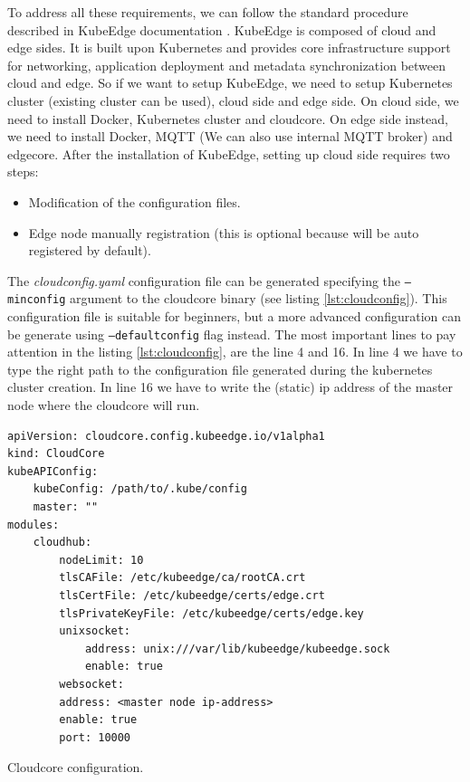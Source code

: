 To address all these requirements, we can follow the standard procedure described in KubeEdge documentation \cite{kubeedgedoc}.
KubeEdge is composed of cloud and edge sides. It is built upon Kubernetes and provides core infrastructure support for networking, application deployment and metadata synchronization between cloud and edge. So if we want to setup KubeEdge, we need to setup Kubernetes cluster (existing cluster can be used), cloud side and edge side.
On cloud side, we need to install Docker, Kubernetes cluster and cloudcore. On edge side instead, we need to install Docker, MQTT (We can also use internal MQTT broker) and edgecore. 
After the installation of KubeEdge, setting up cloud side requires two steps: 
\begin{itemize}
	\item Modification of the configuration files.
	\item Edge node manually registration (this is optional because will be auto registered by default).
\end{itemize}

The \textit{cloudconfig.yaml} configuration file can be generated specifying the \texttt{--minconfig} argument to the cloudcore binary (see listing \ref{lst:cloudconfig}).
This configuration file is suitable for beginners, but a more advanced configuration can be generate using \texttt{--defaultconfig} flag instead.
The most important lines to pay attention in the listing \ref{lst:cloudconfig}, are the line 4 and 16. In line 4 we have to type the right path to the configuration file generated during the kubernetes cluster creation. In line 16 we have to write the (static) ip address of the master node where the cloudcore will run.
\begin{listing}[tb]
\begin{verbatim}
apiVersion: cloudcore.config.kubeedge.io/v1alpha1
kind: CloudCore
kubeAPIConfig:
    kubeConfig: /path/to/.kube/config
    master: ""
modules:
    cloudhub:
        nodeLimit: 10
        tlsCAFile: /etc/kubeedge/ca/rootCA.crt
        tlsCertFile: /etc/kubeedge/certs/edge.crt
        tlsPrivateKeyFile: /etc/kubeedge/certs/edge.key
        unixsocket:
            address: unix:///var/lib/kubeedge/kubeedge.sock
            enable: true
        websocket:
        address: <master node ip-address>
        enable: true
        port: 10000
\end{verbatim}
\caption{Cloudcore configuration.}
\label{lst:cloudconfig}
\end{listing}

